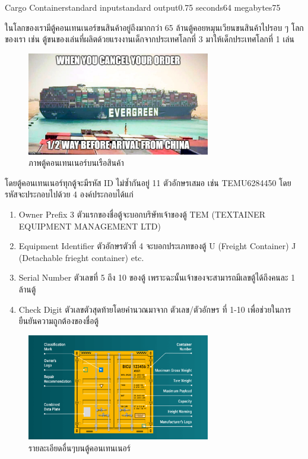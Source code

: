 \documentclass[11pt,a4paper]{article}
\begin{document}
\begin{problem}{Cargo Container}{standard input}{standard output}{0.75 seconds}{64 megabytes}{75}

ในโลกของเรามีตู้คอนเทนเนอร์ขนสินค้าอยู่ถึงมากกว่า 65 ล้านตู้คอยหมุนเวียนขนสินค้าไปรอบ ๆ โลกของเรา เช่น ตู้ขนของเล่นที่ผลิตด้วยแรงงานเด็กจากประเทศโลกที่ 3 มาให้เด็กประเทศโลกที่ 1 เล่น
\begin{figure}[htp]
    \centering
    \includegraphics[width=8cm]{cargocontainercheck/Evergreen.jpg}
    \caption{ภาพตู้คอนเทนเนอร์บนเรือสินค้า}
\end{figure}

โดยตู้คอนเทนเนอร์ทุกตู้จะมีรหัส ID ไม่ซ้ำกันอยู่ 11 ตัวอักษรเสมอ เช่น TEMU6284450 โดยรหัสจะประกอบไปด้วย 4 องค์ประกอบได้แก่

\begin{enumerate}
    \item Owner Prefix 3 ตัวแรกของชื่อตู้จะบอกบริษัทเจ้าของตู้ TEM (TEXTAINER EQUIPMENT MANAGEMENT LTD)
    \item Equipment Identifier ตัวอักษรตัวที่ 4 จะบอกประเภทของตู้ U (Freight Container) J (Detachable frieght container) etc.
    \item Serial Number ตัวเลขที่ 5 ถึง 10 ของตู้ เพราะฉะนั้นเจ้าของจะสามารถมีเลขตู้ได้ถึงคนละ 1 ล้านตู้
    \item Check Digit ตัวเลขตัวสุดท้ายโดยคำนวณมาจาก ตัวเลข/ตัวอักษร ที่ 1-10 เพื่อช่วยในการยืนยันความถูกต้องของชื่อตู้
\end{enumerate}

\begin{figure}[htp]
    \centering
    \includegraphics[width=8cm]{cargocontainercheck/Container-Markings-1-1.png}
    \caption{รายละเอียดอื่นๆบนตู้คอนเทนเนอร์}
\end{figure}


\end{problem}
\end{document}
